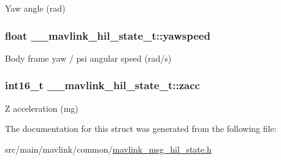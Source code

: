 Yaw angle (rad) 

\hypertarget{struct____mavlink__hil__state__t_a50f16fd863e535867c95fabcfef2e498}{
\subsubsection[{yawspeed}]{\setlength{\rightskip}{0pt plus 5cm}float \+\_\+\+\_\+mavlink\+\_\+hil\+\_\+state\+\_\+t\+::yawspeed}}\label{struct____mavlink__hil__state__t_a50f16fd863e535867c95fabcfef2e498}


Body frame yaw / psi angular speed (rad/s) 

\hypertarget{struct____mavlink__hil__state__t_a79b626e6b13844d733a6a6c02e506b90}{
\subsubsection[{zacc}]{\setlength{\rightskip}{0pt plus 5cm}int16\+\_\+t \+\_\+\+\_\+mavlink\+\_\+hil\+\_\+state\+\_\+t\+::zacc}}\label{struct____mavlink__hil__state__t_a79b626e6b13844d733a6a6c02e506b90}


Z acceleration (mg) 



The documentation for this struct was generated from the following file\+:\begin{DoxyCompactItemize}
\item 
src/main/mavlink/common/\hyperlink{mavlink__msg__hil__state_8h}{mavlink\+\_\+msg\+\_\+hil\+\_\+state.\+h}\end{DoxyCompactItemize}
